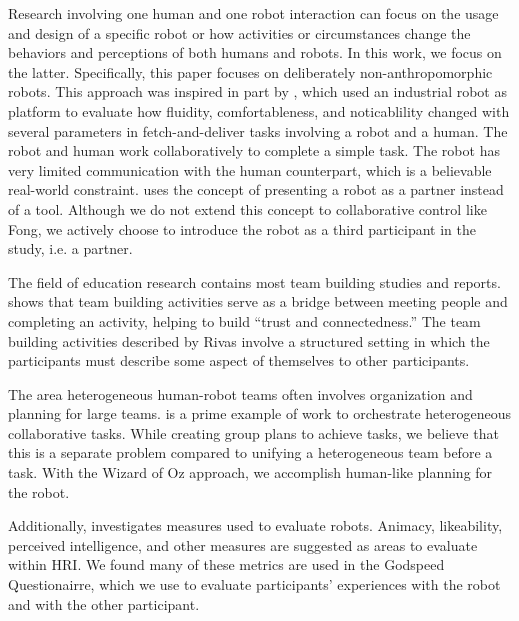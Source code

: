 \documentclass{acm_proc_article-sp}
\begin{document}
Research involving one human and one robot interaction can focus on the usage and design of a specific robot or how activities or circumstances change the behaviors and perceptions of both humans and robots. In this work, we focus on the latter. Specifically, this paper focuses on deliberately non-anthropomorphic robots. This approach was inspired in part by \cite{Unhelkar}, which used an industrial robot as platform to evaluate how fluidity, comfortableness, and noticablility changed with several parameters in fetch-and-deliver tasks involving a robot and a human. The robot and human work collaboratively to complete a simple task. The robot has very limited communication with the human counterpart, which is a believable real-world constraint.
\cite{Fong} uses the concept of presenting a robot as a partner instead of a tool. Although we do not extend this concept to collaborative control like Fong, we actively choose to introduce the robot as a third participant in the study, i.e. a partner.

The field of education research contains most team building studies and reports. \cite{Rivas} shows that team building activities serve as a bridge between meeting people and completing an activity, helping to build ``trust and connectedness.'' The team building activities described by Rivas involve a structured setting in which the participants must describe some aspect of themselves to other participants.  

The area heterogeneous human-robot teams often involves organization and planning for large teams. \cite{Ponda} is a prime example of work to orchestrate heterogeneous collaborative tasks. While creating group plans to achieve tasks, we believe that this is a separate problem compared to unifying a heterogeneous team before a task. With the Wizard of Oz approach, we accomplish human-like planning for the robot. 

Additionally, \cite{Godspeed} investigates measures used to evaluate robots. Animacy, likeability, perceived intelligence, and other measures are suggested as areas to evaluate within HRI. We found many of these metrics are used in the Godspeed Questionairre, which we use to evaluate participants' experiences with the robot and with the other participant.
\end{document}
